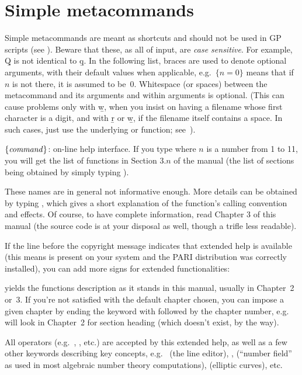 \section{Simple metacommands}\label{se:meta}

\noindent
Simple metacommands are meant as shortcuts and should not be used in GP
scripts (see ). Beware that these, as all of  input,
are \emph{case sensitive}. For example, \b{Q} is not identical to \b{q}. In
the following list, braces are used to denote optional arguments, with their
default values when applicable, e.g.~$\{n=0\}$ means that if $n$ is not
there, it is assumed to be~$0$. Whitespace (or spaces) between the
metacommand and its arguments and within arguments is optional. (This can
cause problems only with \b{w}, when you insist on having a filename whose
first character is a digit, and with \b{r} or \b{w}, if the filename itself
contains a space. In such cases, just use the underlying  or
 function; see~).

 $\{\hbox{\it command\/}\}$:  on-line help interface.
If you type  where $n$ is a number from 1 to 11, you will get the
list of functions in Section $3.n$ of the manual (the list of sections being
obtained by simply typing ). \label{se:exthelp}

These names are in general not informative enough. More details can be
obtained by typing , which gives a short explanation of
the function's calling convention and effects. Of course, to have complete
information, read Chapter 3 of this manual (the source code is at your
disposal as well, though a trifle less readable).

If the line before the copyright message indicates that extended help is
available (this means  is present on your system and the PARI
distribution was correctly installed), you can add more  signs for
extended functionalities:

 yields the functions description as it stands in this
manual, usually in Chapter~2 or~3. If you're not satisfied with the default
chapter chosen, you can impose a given chapter by ending the keyword with
 followed by the chapter number, e.g.~ will look in
Chapter~2 for section heading  (which doesn't exist, by the way).

All operators (e.g.~\kbd{+}, \kbd{\&\&}, etc.) are accepted by this
extended help, as well as a few other keywords describing key  concepts,
e.g.~ (the line editor), ,  (``number
field'' as used in most algebraic number theory computations), 
(elliptic curves), etc.

